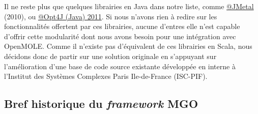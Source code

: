 Il ne reste plus que quelques librairies en Java dans notre liste, comme \href{http://jmetal.sourceforge.net/}{@JMetal} (2010), ou \href{http://opt4j.sourceforge.net/}{@Opt4J (Java) 2011}. Si nous n'avons rien à redire sur les fonctionnalités offertent par ces librairies, aucune d'entres elle n'est capable d'offrir cette modularité dont nous avons besoin pour une intégration avec OpenMOLE. Comme il n'existe pas d'équivalent de ces librairies en Scala, nous décidons donc de partir sur une solution originale en s'appuyant sur l'amélioration d'une base de code source existante développée en interne à l'Institut des Systèmes Complexes Paris Ile-de-France (ISC-PIF).
















\subsection{Bref historique du \textit{\textit{framework}} MGO}
\label{ssec:historique_mgo}

